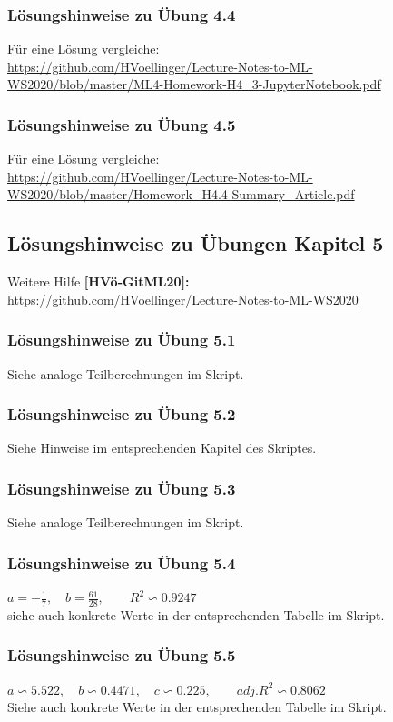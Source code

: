 \documentclass[12pt]{article}
\begin{document}
\subsubsection{Lösungshinweise zu Übung 4.4}
%
Für eine Lösung vergleiche:\\
\url{https://github.com/HVoellinger/Lecture-Notes-to-ML-WS2020/blob/master/ML4-Homework-H4_3-JupyterNotebook.pdf}
%
\subsubsection{Lösungshinweise zu Übung 4.5}
%
Für eine Lösung vergleiche:\\
\url{https://github.com/HVoellinger/Lecture-Notes-to-ML-WS2020/blob/master/Homework_H4.4-Summary_Article.pdf}
%
\newpage

\subsection{Lösungshinweise zu Übungen Kapitel 5}
%
\hspace*{0.1cm} Weitere Hilfe \textbf{[HVö-GitML20]:}\\ 
\url{https://github.com/HVoellinger/Lecture-Notes-to-ML-WS2020}
%
\subsubsection{Lösungshinweise zu Übung 5.1}
%
Siehe analoge Teilberechnungen im Skript.
%
\subsubsection{Lösungshinweise zu Übung 5.2}
%
Siehe Hinweise im entsprechenden Kapitel des Skriptes.  
%
\subsubsection{Lösungshinweise zu Übung 5.3}
%
Siehe analoge Teilberechnungen im Skript.
%
\subsubsection{Lösungshinweise zu Übung 5.4}
%
$ a = - \frac{1}{7}, \quad b =  \frac{61}{28}, \qquad R^2 \backsim 0.9247 $\\[0.2cm]
siehe auch konkrete Werte in der entsprechenden Tabelle im Skript.
%
\subsubsection{Lösungshinweise zu Übung 5.5}
%
$ a \backsim 5.522, \quad b \backsim 0.4471, \quad c \backsim 0.225, \qquad adj.R^2 \backsim 0.8062 $\\[0.2cm]
Siehe auch konkrete Werte in der entsprechenden Tabelle im Skript.
%
\end{document}
